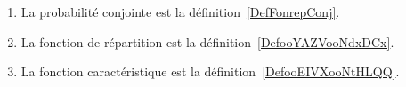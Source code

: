 
	\label{THEMEooProbaDensite}
\begin{enumerate}
	\item
	      La probabilité conjointe est la définition~\ref{DefFonrepConj}.
	\item
	      La fonction de répartition est la définition~\ref{DefooYAZVooNdxDCx}.
	\item
	      La fonction caractéristique est la définition~\ref{DefooEIVXooNtHLQQ}.
\end{enumerate}
